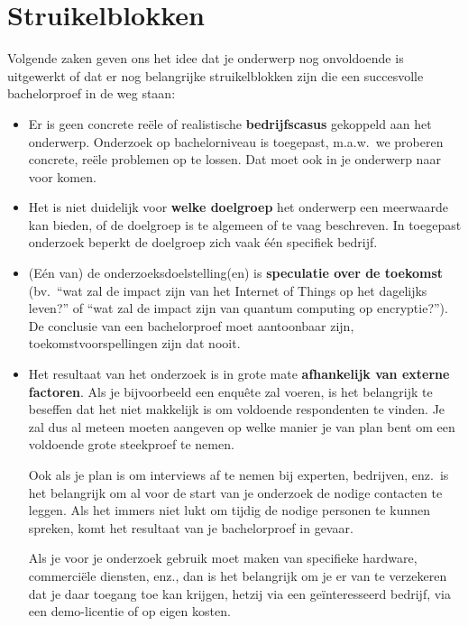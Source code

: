 \section{Struikelblokken}%
\label{sec:onderwerp-struikelblokken}

Volgende zaken geven ons het idee dat je onderwerp nog onvoldoende is uitgewerkt of dat er nog belangrijke struikelblokken zijn die een succesvolle bachelorproef in de weg staan:

\begin{itemize}
  \item Er is geen concrete reële of realistische \textbf{bedrijfscasus} gekoppeld aan het onderwerp. Onderzoek op bachelorniveau is toegepast, m.a.w.~we proberen concrete, reële problemen op te lossen. Dat moet ook in je onderwerp naar voor komen.

  \item Het is niet duidelijk voor \textbf{welke doelgroep} het onderwerp een meerwaarde kan bieden, of de doelgroep is te algemeen of te vaag beschreven. In toegepast onderzoek beperkt de doelgroep zich vaak één specifiek bedrijf.

  \item (Eén van) de onderzoeksdoelstelling(en) is \textbf{speculatie over de toekomst} (bv.\ ``wat zal de impact zijn van het Internet of Things op het dagelijks leven?'' of ``wat zal de impact zijn van quantum computing op encryptie?''). De conclusie van een bachelorproef moet aantoonbaar zijn, toekomstvoorspellingen zijn dat nooit.

  \item Het resultaat van het onderzoek is in grote mate \textbf{afhankelijk van externe factoren}. Als je bijvoorbeeld een enquête zal voeren, is het belangrijk te beseffen dat het niet makkelijk is om voldoende respondenten te vinden. Je zal dus al meteen moeten aangeven op welke manier je van plan bent om een voldoende grote steekproef te nemen.
  
  Ook als je plan is om interviews af te nemen bij experten, bedrijven, enz.\ is het belangrijk om al voor de start van je onderzoek de nodige contacten te leggen. Als het immers niet lukt om tijdig de nodige personen te kunnen spreken, komt het resultaat van je bachelorproef in gevaar.

  Als je voor je onderzoek gebruik moet maken van specifieke hardware, commerciële diensten, enz., dan is het belangrijk om je er van te verzekeren dat je daar toegang toe kan krijgen, hetzij via een geïnteresseerd bedrijf, via een demo-licentie of op eigen kosten.


\end{itemize}
